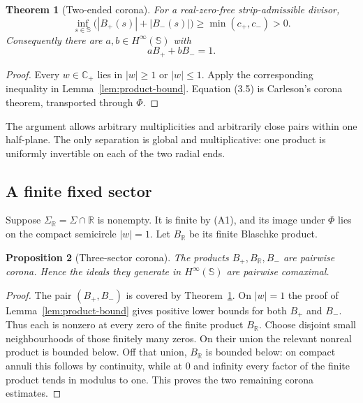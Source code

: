 \documentclass[11pt]{article}
\newtheorem{theorem}{Theorem}[section]
\newtheorem{proposition}[theorem]{Proposition}
\theoremstyle{definition}
\theoremstyle{remark}
\newcommand{\C}{\mathbb C}
\newcommand{\R}{\mathbb R}
\begin{document}
\begin{theorem}[Two-ended corona]\label{thm:corona}
For a real-zero-free strip-admissible divisor,
\[
 \inf_{s\in\mathbb S}\bigl(|B_+(s)|+|B_-(s)|\bigr)
 \ge\min(c_+,c_-)>0.                                  \tag{3.4}
\]
Consequently there are $a,b\in H^\infty(\mathbb S)$ with
\[
                        aB_+ + bB_-=1.                \tag{3.5}
\]
\end{theorem}

\begin{proof}
Every $w\in\C_+$ lies in $|w|\ge1$ or $|w|\le1$.  Apply the corresponding
inequality in Lemma~\ref{lem:product-bound}.  Equation (3.5) is Carleson's
corona theorem, transported through $\Phi$.
\end{proof}

The argument allows arbitrary multiplicities and arbitrarily close pairs within
one half-plane.  The only separation is global and multiplicative: one product
is uniformly invertible on each of the two radial ends.

\subsection{A finite fixed sector}

Suppose $\Sigma_{\R}=\Sigma\cap\R$ is nonempty.  It is finite by (A1), and its
image under $\Phi$ lies on the compact semicircle $|w|=1$.  Let $B_{\R}$ be its
finite Blaschke product.

\begin{proposition}[Three-sector corona]\label{prop:three-corona}
The products $B_+,B_{\R},B_-$ are pairwise corona.  Hence the ideals they
generate in $H^\infty(\mathbb S)$ are pairwise comaximal.
\end{proposition}

\begin{proof}
The pair $(B_+,B_-)$ is covered by Theorem~\ref{thm:corona}.  On $|w|=1$ the
proof of Lemma~\ref{lem:product-bound} gives positive lower bounds for both
$B_+$ and $B_-$.  Thus each is nonzero at every zero of the finite product
$B_{\R}$.  Choose disjoint small neighbourhoods of those finitely many zeros.
On their union the relevant nonreal product is bounded below.  Off that union,
$B_{\R}$ is bounded below: on compact annuli this follows by continuity, while
at $0$ and infinity every factor of the finite product tends in modulus to one.
This proves the two remaining corona estimates.
\end{proof}
\end{document}
